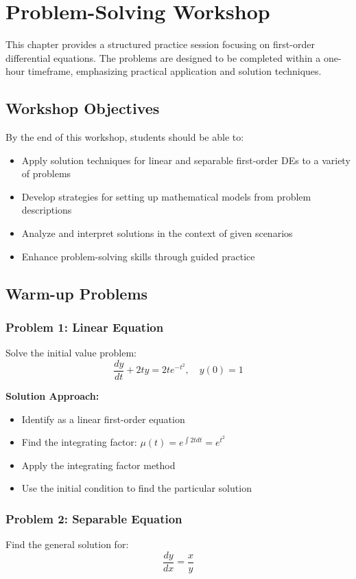\documentclass[12pt, letterpaper]{book}
\theoremstyle{problemstyle}
\theoremstyle{solutionstyle}
\begin{document}
\chapter{Problem-Solving Workshop}
\label{chap:session_4}

This chapter provides a structured practice session focusing on first-order differential equations. The problems are designed to be completed within a one-hour timeframe, emphasizing practical application and solution techniques.

\section{Workshop Objectives}
By the end of this workshop, students should be able to:
\begin{itemize}
    \item Apply solution techniques for linear and separable first-order DEs to a variety of problems
    \item Develop strategies for setting up mathematical models from problem descriptions
    \item Analyze and interpret solutions in the context of given scenarios
    \item Enhance problem-solving skills through guided practice
\end{itemize}

\section{Warm-up Problems}

\subsection{Problem 1: Linear Equation}
Solve the initial value problem:
$$\frac{dy}{dt} + 2ty = 2te^{-t^2}, \quad y(0) = 1$$

\textbf{Solution Approach:}
\begin{itemize}
    \item Identify as a linear first-order equation
    \item Find the integrating factor: $\mu(t) = e^{\int 2t dt} = e^{t^2}$
    \item Apply the integrating factor method
    \item Use the initial condition to find the particular solution
\end{itemize}

\subsection{Problem 2: Separable Equation}
Find the general solution for:
$$\frac{dy}{dx} = \frac{x}{y}$$
\end{document}
